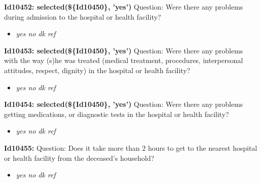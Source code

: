 \documentclass{article}%
\begin{document}
\textbf{Id10452: selected(\$\{Id10450\}, 'yes')\newline%
}%
Question: Were there any problems during admission to the hospital or health facility?\newline%
%
\begin{itemize}%
\item%
\textit{yes\newline%
 no\newline%
 dk\newline%
 ref\newline%
}%
\end{itemize}%
\textbf{Id10453: selected(\$\{Id10450\}, 'yes')\newline%
}%
Question: Were there any problems with the way (s)he was treated (medical treatment, procedures, interpersonal attitudes, respect, dignity) in the hospital or health facility?\newline%
%
\begin{itemize}%
\item%
\textit{yes\newline%
 no\newline%
 dk\newline%
 ref\newline%
}%
\end{itemize}%
\textbf{Id10454: selected(\$\{Id10450\}, 'yes')\newline%
}%
Question: Were there any problems getting medications, or diagnostic tests in the hospital or health facility?\newline%
%
\begin{itemize}%
\item%
\textit{yes\newline%
 no\newline%
 dk\newline%
 ref\newline%
}%
\end{itemize}%
\textbf{Id10455: \newline%
}%
Question: Does it take more than 2 hours to get to the nearest hospital or health facility from the deceased's household?\newline%
%
\begin{itemize}%
\item%
\textit{yes\newline%
 no\newline%
 dk\newline%
 ref\newline%
}%
\end{itemize}%
\end{document}
